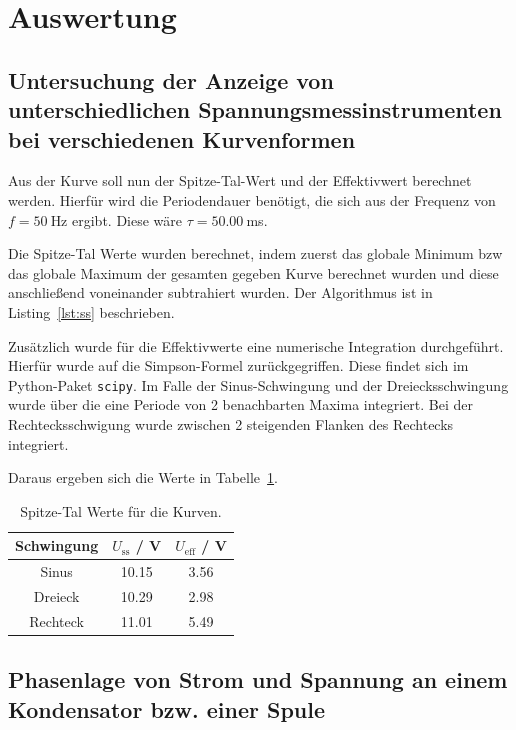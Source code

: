 \documentclass{article}
\begin{document}
\section{Auswertung}

\subsection{Untersuchung  der  Anzeige  von  unterschiedlichen  Spannungsmessinstrumenten  bei verschiedenen Kurvenformen }

Aus der Kurve soll nun der Spitze-Tal-Wert und der Effektivwert berechnet werden. Hierfür wird die Periodendauer benötigt, die sich aus der Frequenz von $f=50~$Hz ergibt. Diese wäre $\tau = 50.00~$ms.

Die Spitze-Tal Werte wurden berechnet, indem zuerst das globale Minimum bzw das globale Maximum der gesamten gegeben Kurve berechnet wurden und diese anschließend voneinander subtrahiert wurden. Der Algorithmus ist in Listing~\ref{lst:ss} beschrieben.





Zusätzlich wurde für die Effektivwerte eine numerische Integration durchgeführt. Hierfür wurde auf die Simpson-Formel zurückgegriffen. Diese findet sich im Python-Paket \texttt{scipy}. Im Falle der Sinus-Schwingung und der Dreiecksschwingung wurde über die eine Periode von 2 benachbarten Maxima integriert. Bei der Rechtecksschwigung wurde zwischen 2 steigenden Flanken des Rechtecks integriert. 





Daraus ergeben sich die Werte in Tabelle~\ref{tab:task1_ergebnisse}.
\begin{table}[H]
\caption{Spitze-Tal Werte für die Kurven.}
\label{tab:task1_ergebnisse}
\begin{tabular}{c|cc}
Schwingung & $U_\text{ss}$ / V & $U_\text{eff}$ / V  \\
\hline
Sinus & 10.15 & 3.56 \\
Dreieck & 10.29 & 2.98 \\
Rechteck & 11.01 & 5.49
\end{tabular}
\end{table}



\subsection{Phasenlage von Strom und Spannung an einem Kondensator bzw. einer Spule}
\end{document}

